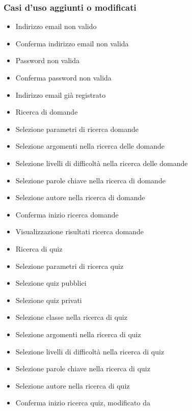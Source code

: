 \subsubsection{Casi d'uso aggiunti o modificati}
\begin{itemize}
	
	\item {} Indirizzo email non valido 
	\item {} Conferma indirizzo email non valida
	\item {} Password non valida 
	\item {} Conferma password non valida
	\item {} Indirizzo email già registrato
	\item {} Ricerca di domande
	\item {} Selezione parametri di ricerca domande 
	\item {} Selezione argomenti nella ricerca delle domande
	\item {} Selezione livelli di difficoltà nella ricerca delle domande
	\item {} Selezione parole chiave nella ricerca di domande
	\item {} Selezione autore nella ricerca di domande
	\item {} Conferma inizio ricerca domande 
	\item {} Visualizzazione risultati ricerca domande 
	\item {} Ricerca di quiz
	\item {} Selezione parametri di ricerca quiz
	\item {} Selezione quiz pubblici
	\item {} Selezione quiz privati
	\item {} Selezione classe nella ricerca di quiz
	\item {} Selezione argomenti nella ricerca di quiz
	\item {} Selezione livelli di difficoltà nella ricerca di quiz
	\item {} Selezione parole chiave nella ricerca di quiz 
	\item {} Selezione autore nella ricerca di quiz
	\item {} Conferma inizio ricerca quiz, modificato da 

\end{itemize}
